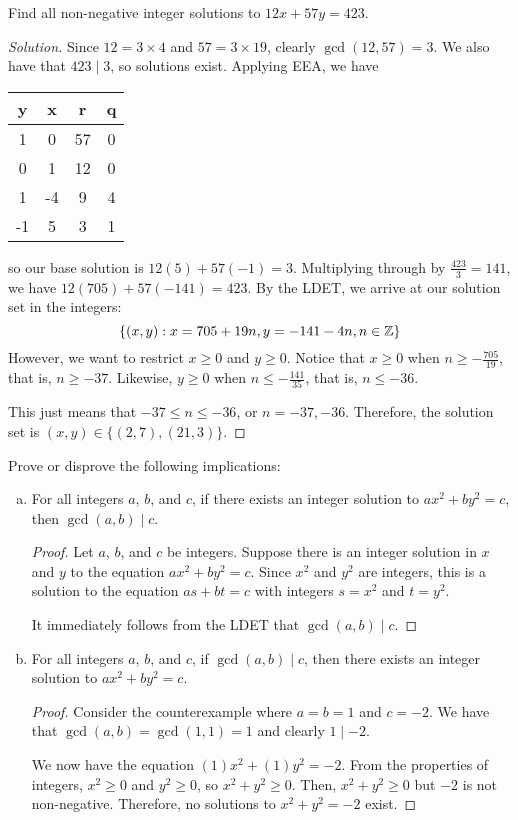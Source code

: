 \documentclass{agony}
\begin{document}
\question Find all non-negative integer solutions to $12x+57y=423$.
\begin{proof}[Solution]
  Since $12 = 3\times4$ and $57=3\times19$, clearly $\gcd(12,57)=3$.
  We also have that $423 \mid 3$, so solutions exist.
  Applying EEA, we have
  \begin{center}
    \begin{tabular}{C|C|C|C}
      y  & x  & r  & q \\   & 0  & 57 & 0 \\
      0  & 1  & 12 & 0 \\
      1  & -4 & 9  & 4 \\
      -1 & 5  & 3  & 1
    \end{tabular}
  \end{center}
  so our base solution is $12(5)+57(-1)=3$.
  Multiplying through by $\frac{423}{3}=141$, we have $12(705)+57(-141)=423$.
  By the LDET, we arrive at our solution set in the integers:
  \begin{equation*}
    \{ (x,y) : x = 705 + 19n, y = -141 - 4n, n\in\mathbb{Z} \}
  \end{equation*}
  However, we want to restrict $x \geq 0$ and $y \geq 0$.
  Notice that $x \geq 0$ when $n \geq -\frac{705}{19}$, that is, $n \geq -37$.
  Likewise, $y \geq 0$ when $n \leq -\frac{141}{35}$, that is, $n \leq -36$.

  This just means that $-37 \leq n \leq -36$, or $n=-37,-36$.
  Therefore, the solution set is $(x,y)\in\{(2,7),(21,3)\}$.
\end{proof}


\question Prove or disprove the following implications:
\begin{enumerate}[(a)]
  \item For all integers $a$, $b$, and $c$, if there exists an integer solution to $ax^2+by^2=c$,
        then $\gcd(a,b) \mid c$.
        \begin{proof}
          Let $a$, $b$, and $c$ be integers.
          Suppose there is an integer solution in $x$ and $y$ to the equation $ax^2+by^2=c$.
          Since $x^2$ and $y^2$ are integers, this is a solution to the equation $as+bt=c$
          with integers $s=x^2$ and $t=y^2$.

          It immediately follows from the LDET that $\gcd(a,b) \mid c$.
        \end{proof}
  \item For all integers $a$, $b$, and $c$, if $\gcd(a,b) \mid c$,
        then there exists an integer solution to $ax^2+by^2=c$.
        \begin{proof}
          Consider the counterexample where $a=b=1$ and $c=-2$.
          We have that $\gcd(a,b)=\gcd(1,1)=1$ and clearly $1 \mid -2$.

          We now have the equation $(1)x^2+(1)y^2=-2$.
          From the properties of integers, $x^2 \geq 0$ and $y^2 \geq 0$, so $x^2+y^2 \geq 0$.
          Then, $x^2 + y^2 \geq 0$ but $-2$ is not non-negative.
          Therefore, no solutions to $x^2+y^2=-2$ exist.
        \end{proof}
\end{enumerate}
\end{document}
